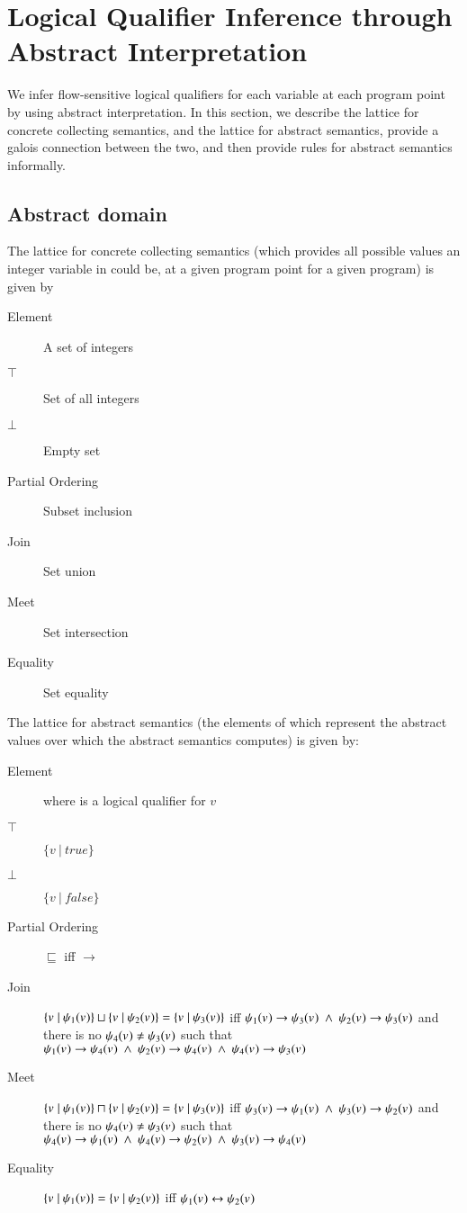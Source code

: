 \section{Logical Qualifier Inference through Abstract Interpretation}

We infer flow-sensitive logical qualifiers for each variable at each program point by using abstract interpretation.
In this section, we describe the lattice for concrete collecting semantics, and the lattice for abstract semantics, provide a galois connection between the two, and then provide rules for abstract semantics informally.

\subsection{Abstract domain}
The lattice for concrete collecting semantics (which provides all possible values an integer variable in \lang could be, at a given program point for a given program) is given by 
\begin{description}
\item[Element] A set of integers
\item[$\top$] Set of all integers
\item[$\bot$] Empty set
\item[Partial Ordering] Subset inclusion
\item[Join] Set union
\item[Meet] Set intersection
\item[Equality] Set equality
\end{description}

The lattice for abstract semantics (the elements of which represent the abstract values over which the abstract semantics computes) is given by:
\begin{description}
\item[Element] \av{}{} where \pr{}{} is a logical qualifier for $v$
\item[$\top$] $\{ v\ |\ \textit{true}\}$
\item[$\bot$] $\{ v\ |\ \textit{false}\}$
\item[Partial Ordering]  $\sqsubseteq$  iff  $\rightarrow$ 
\item[Join] $\{v_{}\ |\ \psi_{1}(v_{})\} \sqcup \{v_{}\ |\ \psi_{2}(v_{})\} = \{v_{}\ |\ \psi_{3}(v_{})\}$ iff $\psi_{1}(v_{}) \rightarrow \psi_{3}(v_{})\ \land\ \psi_{2}(v_{}) \rightarrow \psi_{3}(v_{})$ and there is no $\psi_{4}(v_{}) \neq \psi_{3}(v_{})$ such that $\pr{}{1} \rightarrow \pr{}{4}\ \land\ \pr{}{2} \rightarrow \pr{}{4} \ \land \ \pr{}{4} \rightarrow \pr{}{3}$
\item[Meet] $\{v_{}\ |\ \psi_{1}(v_{})\} \sqcap \{v_{}\ |\ \psi_{2}(v_{})\} = \{v_{}\ |\ \psi_{3}(v_{})\}$ iff $\psi_{3}(v_{}) \rightarrow \psi_{1}(v_{})\ \land\ \psi_{3}(v_{}) \rightarrow \psi_{2}(v_{})$ and there is no $\psi_{4}(v_{}) \neq \psi_{3}(v_{})$ such that $\pr{}{4} \rightarrow \pr{}{1}\ \land\ \pr{}{4} \rightarrow \pr{}{2} \ \land \ \pr{}{3} \rightarrow \pr{}{4}$
\item[Equality] $\{v_{}\ |\ \psi_{1}(v_{})\} = \{v_{}\ |\ \psi_{2}(v_{})\}$ iff $\psi_{1}(v_{}) \leftrightarrow \psi_{2}(v_{})$
\end{description}

